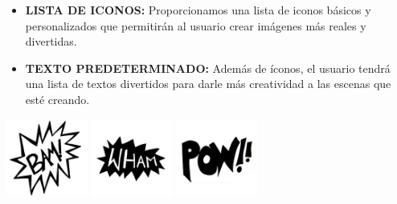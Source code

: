 \documentclass[utf8]{beamer}
\begin{document}
	\begin{frame}
		\begin{center}
			\begin{itemize}
				\vspace{0.5cm}
				\item\textbf{LISTA DE ICONOS:}
				\newline
				Proporcionamos una lista de iconos básicos y personalizados que
				\newline
				 permitirán al usuario crear imágenes más reales y divertidas.
				\newline
				\pause
				\item\textbf{TEXTO PREDETERMINADO:}
				\newline
				Además de íconos, el usuario tendrá una lista de textos divertidos
				\newline
				para darle más creatividad a las escenas que esté creando.
			\end{itemize}
		\end{center} 
		\pause
		\begin{center}
			\begingroup
				\includegraphics[width=0.2\textwidth]{icono1.jpg}
			\endgroup
			\pause
			\begingroup
				\includegraphics[width=0.2\textwidth]{icono2.jpg}
			\endgroup
			\pause
			\begingroup
				\includegraphics[width=0.2\textwidth]{icono3.jpg}
			\endgroup
		\end{center}
	\end{frame}	
\end{document}
